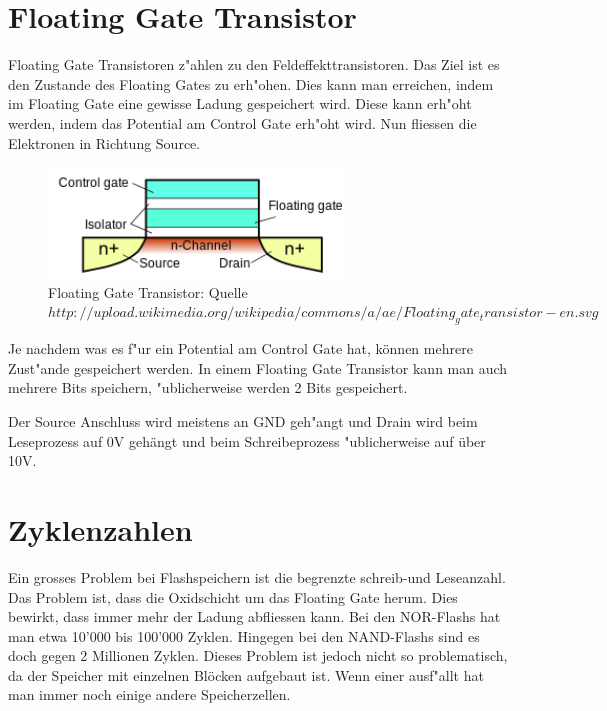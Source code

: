 \begin{refsection}
\section{Floating Gate Transistor}
Floating Gate Transistoren z"ahlen zu den Feldeffekttransistoren. Das Ziel ist es den Zustande des Floating Gates zu erh"ohen. Dies kann man erreichen, indem im Floating Gate eine gewisse Ladung gespeichert wird. Diese kann erh"oht werden, indem das Potential am Control Gate erh"oht wird. Nun fliessen die Elektronen in Richtung Source. 

\begin{figure}
\centering
\includegraphics[width=0.7\textwidth]{flash/graphics/Floatinggate.png}
\caption{Floating Gate Transistor: Quelle $http://upload.wikimedia.org/wikipedia/commons/a/ae/Floating_gate_transistor-en.svg$
\label{skript:Floatinggatetransistor}}
\end{figure}

Je nachdem was es f"ur ein Potential am Control Gate hat, können mehrere Zust"ande gespeichert werden. In einem Floating Gate Transistor kann man auch mehrere Bits speichern, "ublicherweise werden 2 Bits gespeichert.

Der Source Anschluss wird meistens an GND geh"angt und Drain wird beim Leseprozess auf 0V gehängt und beim Schreibeprozess "ublicherweise auf über 10V. 


\section{Zyklenzahlen}
Ein grosses Problem bei Flashspeichern ist die begrenzte schreib-und Leseanzahl. Das Problem ist, dass die Oxidschicht um das Floating Gate herum. Dies bewirkt, dass immer mehr der Ladung abfliessen kann. Bei den NOR-Flashs hat man etwa 10'000 bis 100'000 Zyklen. Hingegen bei den NAND-Flashs sind es doch gegen 2 Millionen Zyklen. Dieses Problem ist jedoch nicht so problematisch, da der Speicher mit einzelnen Blöcken aufgebaut ist. Wenn einer ausf"allt hat man immer noch einige andere Speicherzellen.


\end{refsection}
